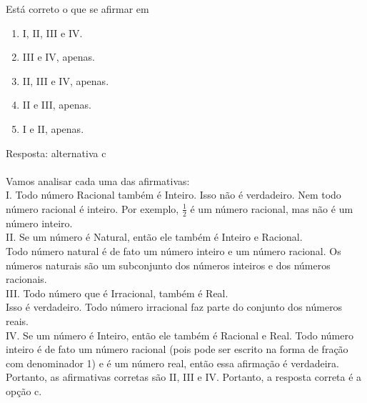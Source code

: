 \documentclass[a4paper,14pt]{article}
\begin{document}
\begin{enumerate}
        Está correto o que se afirmar em
        
        \begin{enumerate}
        	\item I, II, III e IV.
        	\item III e IV, apenas. 
        	\item II, III e IV, apenas.
        	\item II e III, apenas.
        	\item I e II, apenas.
        \end{enumerate}
        Resposta: alternativa c \\ \\
        Vamos analisar cada uma das afirmativas: \\
        
        I. Todo número Racional também é Inteiro.
        Isso não é verdadeiro. Nem todo número racional é inteiro. Por exemplo, $\frac{1}{2}$ é um número racional, mas não é um número inteiro. \\
        
        II. Se um número é Natural, então ele também é Inteiro e Racional. \\
        Todo número natural é de fato um número inteiro e um número racional. Os números naturais são um subconjunto dos números inteiros e dos números racionais. \\
        
        III. Todo número que é Irracional, também é Real. \\
        Isso é verdadeiro. Todo número irracional faz parte do conjunto dos números reais. \\
        
        IV. Se um número é Inteiro, então ele também é Racional e Real.
        Todo número inteiro é de fato um número racional (pois pode ser escrito na forma de fração com denominador 1) e é um número real, então essa afirmação é verdadeira. \\
        
        Portanto, as afirmativas corretas são II, III e IV. Portanto, a resposta correta é a opção c.
        
	\end{enumerate}
    

	
\end{document}
